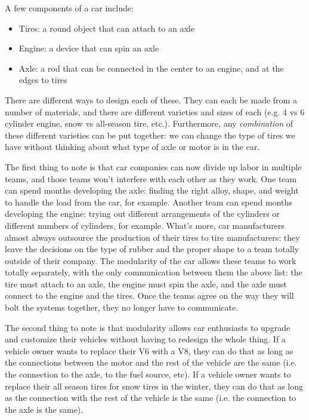 A few components of a car include:
\begin{itemize}
\item Tires: a round object that can attach to an axle
\item Engine: a device that can spin an axle
\item Axle: a rod that can be connected in the center to an engine, and at the edges to tires
\end{itemize} 

There are different ways to design each of these. They can each be made from a number of materials, and there are different varieties and sizes of each (e.g. 4 vs 6 cylinder engine, snow vs all-season tire, etc.). Furthermore, any \textit{combination} of these different varieties can be put together: we can change the type of tires we have without thinking about what type of axle or motor is in the car. 

The first thing to note is that car companies can now divide up labor in multiple teams, and those teams won't interfere with each other as they work. One team can spend months developing the axle: finding the right alloy, shape, and weight to handle the load from the car, for example. Another team can spend months developing the engine: trying out different arrangements of the cylinders or different numbers of cylinders, for example. What's more, car manufacturers almost always outsource the production of their tires to tire manufacturers: they leave the decisions on the type of rubber and the proper shape to a team totally outside of their company. The modularity of the car allows these teams to work totally separately, with the only communication between them the above list: the tire must attach to an axle, the engine must spin the axle, and the axle must connect to the engine and the tires. Once the teams agree on the way they will bolt the systems together, they no longer have to communicate. 

The second thing to note is that modularity allows car enthusiasts to upgrade and customize their vehicles without having to redesign the whole thing. If a vehicle owner wants to replace their V6 with a V8, they can do that as long as the connections between the motor and the rest of the vehicle are the same (i.e. the connection to the axle, to the fuel source, etc). If a vehicle owner wants to replace their all season tires for snow tires in the winter, they can do that as long as the connection with the rest of the vehicle is the same (i.e. the connection to the axle is the same). 

